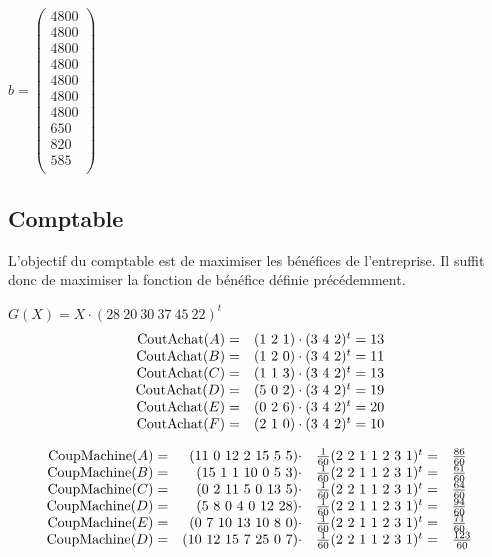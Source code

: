 \documentclass[a4paper, 11pt]{article}
\begin{document}
$b = \begin{pmatrix}
4800\\
4800\\
4800\\
4800\\
4800\\
4800\\
4800\\
650\\
820\\
585\\
\end{pmatrix}$


\subsection{Comptable}
L'objectif du comptable est de maximiser les bénéfices de l'entreprise.
Il suffit donc de maximiser la fonction de bénéfice définie précédemment.

$G(X) = X\cdot(28~20~30~37~45~22)^t$ \\

$$
\begin{array}{r l}
    \mbox{CoutAchat}(A) = & (1~2~1)\cdot(3~4~2)^t = 13 \\
    \mbox{CoutAchat}(B) = & (1~2~0)\cdot(3~4~2)^t = 11 \\
    \mbox{CoutAchat}(C) = & (1~1~3)\cdot(3~4~2)^t = 13 \\
    \mbox{CoutAchat}(D) = & (5~0~2)\cdot(3~4~2)^t = 19 \\
    \mbox{CoutAchat}(E) = & (0~2~6)\cdot(3~4~2)^t = 20 \\
    \mbox{CoutAchat}(F) = & (2~1~0)\cdot(3~4~2)^t = 10 \\
\end{array}
$$

$$
\begin{array}{r r l l}
    \mbox{CoupMachine}(A) = & (11~0~12~2~15~5~5)\cdot  & \frac{1}{60}(2~2~1~1~2~3~1)^t = & \frac{86}{60} \\
    \mbox{CoupMachine}(B) = & (15~1~1~10~0~5~3)\cdot   & \frac{1}{60}(2~2~1~1~2~3~1)^t = & \frac{61}{60} \\
    \mbox{CoupMachine}(C) = & (0~2~11~5~0~13~5)\cdot   & \frac{1}{60}(2~2~1~1~2~3~1)^t = & \frac{64}{60} \\
    \mbox{CoupMachine}(D) = & (5~8~0~4~0~12~28)\cdot   & \frac{1}{60}(2~2~1~1~2~3~1)^t = & \frac{94}{60} \\
    \mbox{CoupMachine}(E) = & (0~7~10~13~10~8~0)\cdot  & \frac{1}{60}(2~2~1~1~2~3~1)^t = & \frac{71}{60} \\
    \mbox{CoupMachine}(D) = & (10~12~15~7~25~0~7)\cdot & \frac{1}{60}(2~2~1~1~2~3~1)^t = & \frac{123}{60} \\
\end{array}
$$
\end{document}
